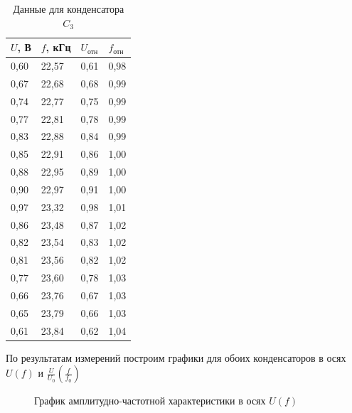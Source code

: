 \begin{table}[H]
    \centering
    \caption{Данные для конденсатора $C_3$}
    \begin{tabular}{|l|l|l|l|}
    \hline
        $U$, В & $f$, кГц & $U_{\text{отн}}$ & $f_{\text{отн}}$ \\ \hline
        0,60 & 22,57 & 0,61 & 0,98 \\ \hline
        0,67 & 22,68 & 0,68 & 0,99 \\ \hline
        0,74 & 22,77 & 0,75 & 0,99 \\ \hline
        0,77 & 22,81 & 0,78 & 0,99 \\ \hline
        0,83 & 22,88 & 0,84 & 0,99 \\ \hline
        0,85 & 22,91 & 0,86 & 1,00 \\ \hline
        0,88 & 22,95 & 0,89 & 1,00 \\ \hline
        0,90 & 22,97 & 0,91 & 1,00 \\ \hline
        0,97 & 23,32 & 0,98 & 1,01 \\ \hline
        0,86 & 23,48 & 0,87 & 1,02 \\ \hline
        0,82 & 23,54 & 0,83 & 1,02 \\ \hline
        0,81 & 23,56 & 0,82 & 1,02 \\ \hline
        0,77 & 23,60 & 0,78 & 1,03 \\ \hline
        0,66 & 23,76 & 0,67 & 1,03 \\ \hline
        0,65 & 23,79 & 0,66 & 1,03 \\ \hline
        0,61 & 23,84 & 0,62 & 1,04 \\ \hline
    \end{tabular}
\end{table}
По результатам измерений построим графики для обоих конденсаторов в осях $U(f)$ и $\frac{U}{U_0} (\frac{f}{f_0})$
\begin{figure}[H]
	\caption{\centering График амплитудно-частотной характеристики в осях $U(f)$}
	\label{fig:image2}
\end{figure}

